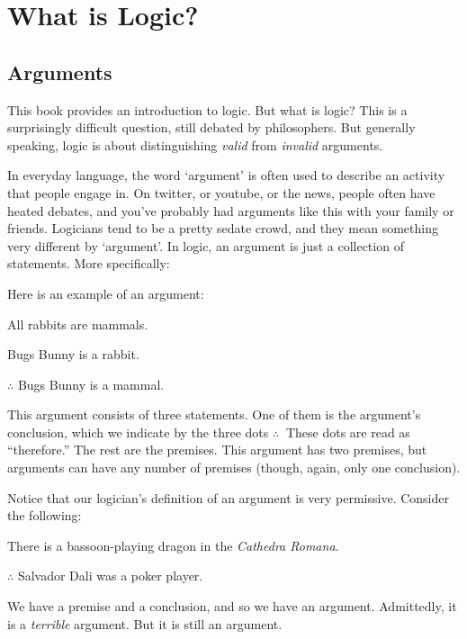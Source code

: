 \chapter{What is Logic?}

\section{Arguments}\label{s:Arguments}


This book provides an introduction to logic.  But what is logic? This is a surprisingly difficult question, still debated by philosophers. But generally speaking, logic is about distinguishing \emph{valid} from \emph{invalid} arguments.

In everyday language, the word `argument' is often used to describe an activity that people engage in.   On twitter, or youtube, or the news, people often have heated debates, and you've probably had arguments like this with your family or friends.  Logicians tend to be a pretty sedate crowd, and they mean something very different by `argument'.  In logic, an argument is just a collection of statements.  More specifically:


\noindent Here is an example of an argument:

\begin{earg}
\item[\ex{exarg1}]All rabbits are mammals.
\item[] Bugs Bunny is a rabbit.
\item[] $\therefore$ Bugs Bunny is a mammal.
\end{earg}
This argument consists of three statements.  One of them is the argument's conclusion, which we indicate by the three dots $\therefore\ $  These dots are read as ``therefore.'' The rest are the premises.  This argument has two premises, but arguments can have any number of premises (though, again, only one conclusion).

Notice that our logician's definition of an argument is very permissive. Consider the following:
	\begin{earg}
		\item[] There is a bassoon-playing dragon in the \emph{Cathedra Romana}.
		\item[] $\therefore$ Salvador Dali was a poker player.
	\end{earg}
We have a premise and a conclusion, and so we have an argument. Admittedly, it is a \emph{terrible} argument. But it is still an argument.  

